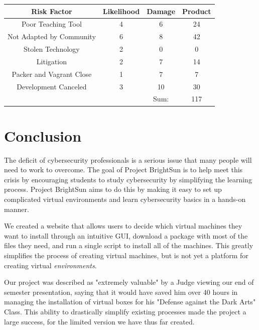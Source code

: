 \documentclass[openright]{report}
\begin{document}
\begin{center}
    \begin{tabular}{c | c | c | c} 
        \hline
        Risk Factor & Likelihood & Damage & Product \\ [0.5ex] 
        \hline\hline
        Poor Teaching Tool & 4 & 6 & 24 \\ 
        \hline
        Not Adapted by Community& 6 & 8 & 42 \\
        \hline
        Stolen Technology & 2 & 0 & 0 \\
        \hline
        Litigation & 2 & 7 & 14 \\
        \hline
        Packer and Vagrant Close & 1 & 7 & 7 \\
        \hline
        Development Canceled & 3 & 10 & 30 \\
        \hline
         &  & Sum: & 117 \\ [1ex] 
    \end{tabular}
\end{center}

\chapter{Conclusion}

\par The deficit of cybersecurity professionals is a serious issue that many people will need to work to overcome. The goal of Project BrightSun is to help meet this crisis by encouraging students to study cybersecurity by simplifying the learning process. Project BrightSun aims to do this by making it easy to set up complicated virtual environments and learn cybersecurity basics in a hands-on manner.

\par We created a website that allows users to decide which virtual machines they want to install through an intuitive GUI, download a package with most of the files they need, and run a single script to install all of the machines. This greatly simplifies the process of creating virtual machines, but is not yet a platform for creating virtual \textit{environments}.

\par  Our project was described as "extremely valuable" by a Judge viewing our end of semester presentation, saying that it would have saved him over 40 hours in managing the installation of virtual boxes for his "Defense against the Dark Arts" Class. This ability to drastically simplify existing processes made the project a large success, for the limited version we have thus far created.
\end{document}

